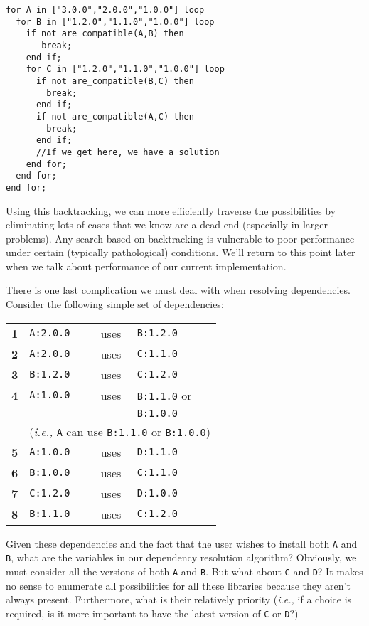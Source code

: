 \documentclass[11pt,a4paper,twocolumn]{article}
\renewcommand{\small}{\fontsize{9.5pt}{11.1pt}\selectfont}
\newcommand{\code}[1]{\texttt{#1}} %
\begin{document}
{\small
\begin{verbatim}
for A in ["3.0.0","2.0.0","1.0.0"] loop
  for B in ["1.2.0","1.1.0","1.0.0"] loop
    if not are_compatible(A,B) then
       break;
    end if;
    for C in ["1.2.0","1.1.0","1.0.0"] loop
      if not are_compatible(B,C) then
        break;
      end if;
      if not are_compatible(A,C) then
        break;
      end if;
      //If we get here, we have a solution
    end for;
  end for;
end for;
\end{verbatim}
}

Using this backtracking, we can more efficiently traverse the
possibilities by eliminating lots of cases that we know are a dead
end (especially in larger problems).  Any search based on backtracking
is vulnerable to poor performance under certain (typically
pathological) conditions.  We'll return to this point later when we
talk about performance of our current implementation.

There is one last complication we must deal with when resolving
dependencies.  Consider the following simple set of dependencies:
{\small
\begin{center}
\begin{tabular}{llcl}
  \textbf{1} &\code{A:2.0.0} &uses &\code{B:1.2.0}\\
  \textbf{2} &\code{A:2.0.0} &uses &\code{C:1.1.0}\\
  \textbf{3} &\code{B:1.2.0} &uses &\code{C:1.2.0}\\
  \textbf{4} &\code{A:1.0.0} &uses &\code{B:1.1.0} or\\
             &               &     &\code{B:1.0.0} \\
             & \multicolumn{3}{c}{(\emph{i.e.,} \code{A} can use \code{B:1.1.0} or \code{B:1.0.0})}\\
  \textbf{5} &\code{A:1.0.0} &uses &\code{D:1.1.0}\\
  \textbf{6} &\code{B:1.0.0} &uses &\code{C:1.1.0}\\
  \textbf{7} &\code{C:1.2.0} &uses &\code{D:1.0.0}\\
  \textbf{8} &\code{B:1.1.0} &uses &\code{C:1.2.0}
\end{tabular}
\end{center}
}
Given these dependencies and the fact that the user wishes to install
both \code{A} and \code{B}, what are the variables in our dependency
resolution algorithm?  Obviously, we must consider all the versions of
both \code{A} and \code{B}.  But what about \code{C} and \code{D}?
It makes no sense to enumerate all possibilities for all these
libraries because they aren't always present.  Furthermore, what is
their relatively priority (\emph{i.e.,} if a choice is required, is it
more important to have the latest version of \code{C} or \code{D}?)
\end{document}

